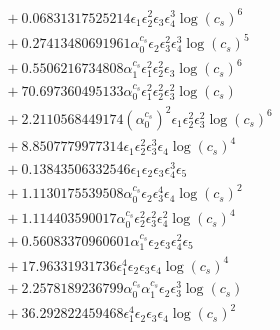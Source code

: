 \documentclass[10pt]{article}
\begin{document}
\begin{align*}
&{}  + 0.06831317525214 \epsilon_{1} \epsilon_{2}^{2} \epsilon_{3} \epsilon_{4}^{3} \log{\left(c_{s} \right)}^{6} \\
&{}  + 0.27413480691961 \alpha_{0}^{c_s} \epsilon_{2} \epsilon_{3}^{2} \epsilon_{4}^{3} \log{\left(c_{s} \right)}^{5} \\
&{}  + 0.5506216734808 \alpha_{1}^{c_s} \epsilon_{1}^{2} \epsilon_{2}^{2} \epsilon_{3} \log{\left(c_{s} \right)}^{6} \\
&{}  + 70.697360495133 \alpha_{0}^{c_s} \epsilon_{1}^{2} \epsilon_{2}^{2} \epsilon_{3}^{2} \log{\left(c_{s} \right)} \\
&{}  + 2.2110568449174 \left(\alpha_{0}^{c_s}\right)^{2} \epsilon_{1} \epsilon_{2}^{2} \epsilon_{3}^{2} \log{\left(c_{s} \right)}^{6} \\
&{}  + 8.8507779977314 \epsilon_{1} \epsilon_{2}^{2} \epsilon_{3}^{3} \epsilon_{4} \log{\left(c_{s} \right)}^{4} \\
&{}  + 0.13843506332546 \epsilon_{1} \epsilon_{2} \epsilon_{3} \epsilon_{4}^{3} \epsilon_{5} \\
&{}  + 1.1130175539508 \alpha_{0}^{c_s} \epsilon_{2} \epsilon_{3}^{4} \epsilon_{4} \log{\left(c_{s} \right)}^{2} \\
&{}  + 1.114403590017 \alpha_{0}^{c_s} \epsilon_{2}^{2} \epsilon_{3}^{2} \epsilon_{4}^{2} \log{\left(c_{s} \right)}^{4} \\
&{}  + 0.56083370960601 \alpha_{1}^{c_s} \epsilon_{2} \epsilon_{3} \epsilon_{4}^{2} \epsilon_{5} \\
&{}  + 17.96331931736 \epsilon_{1}^{4} \epsilon_{2} \epsilon_{3} \epsilon_{4} \log{\left(c_{s} \right)}^{4} \\
&{}  + 2.2578189236799 \alpha_{0}^{c_s} \alpha_{1}^{c_s} \epsilon_{2} \epsilon_{3}^{3} \log{\left(c_{s} \right)} \\
&{}  + 36.292822459468 \epsilon_{1}^{4} \epsilon_{2} \epsilon_{3} \epsilon_{4} \log{\left(c_{s} \right)}^{2}
\end{align*}
\end{document}
